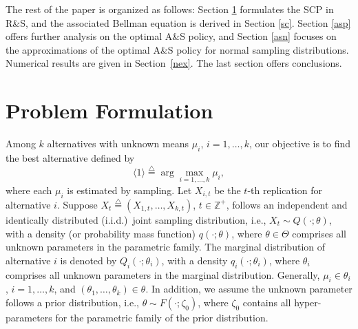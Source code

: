 \documentclass[journal]{IEEEtran}
\newcommand{\ed}{\stackrel{\triangle}{=}}
\begin{document}
 The rest of the paper is organized as follows: Section \ref{pfl} formulates the SCP in R\&S, and the associated Bellman equation is derived in Section \ref{sc}. Section \ref{asp} offers further analysis on the optimal A\&S policy, and Section \ref{asn} focuses on the approximations of the optimal A\&S policy for normal sampling distributions. Numerical results are given in Section~\ref{nex}. The last section offers conclusions.
 \section{Problem Formulation}\label{pfl}
 Among $k$ alternatives with unknown means $\mu_i$, $i=1,\ldots,k$, our objective is to find the best alternative defined by $$\langle 1 \rangle\ed\arg\max_{i=1,\ldots,k}\mu_i,$$ where each $\mu_i$ is estimated by sampling.  
 Let  $X_{i,t}$ be the $t$-th replication for alternative $i$. Suppose $X_{t}\ed(X_{1,t},\ldots,X_{k,t})$, $t\in \mathbb{Z}^{+}$, follows an independent and identically distributed (i.i.d.)\ joint sampling distribution, i.e., $X_{t}\sim Q(\cdot;\theta)$, with a density (or probability mass function) $q(\cdot;\theta)$,  where $\theta\in\Theta$ comprises all unknown parameters in the parametric family. The marginal distribution of alternative $i$ is denoted by  $Q_i(\cdot;\theta_i)$, with a density $q_i(\cdot;\theta_i)$, where $\theta_i$ comprises all unknown parameters in the marginal distribution. Generally, $\mu_i\in  \theta_i$, $i=1,\ldots,k$, and $(\theta_1,\ldots,\theta_k)\in \theta$. 
 In addition, we assume the  unknown parameter follows a prior distribution, i.e., $\theta\sim F(\cdot;\zeta_{0})$, where $\zeta_0$ contains all hyper-parameters for the parametric family of the prior distribution. 
  
\end{document}
